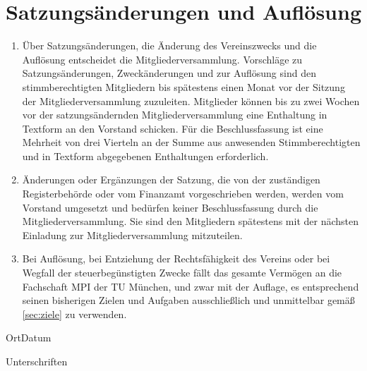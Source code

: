 \documentclass{article}
\begin{document}
\section{Satzungsänderungen und Auflösung}
\label{sec:satzungsaenderung}
\begin{enumerate}
	\item Über Satzungsänderungen, die Änderung des Vereinszwecks und die Auflösung  entscheidet die Mitgliederversammlung. Vorschläge zu Satzungsänderungen, Zweckänderungen und zur Auflösung sind den stimmberechtigten Mitgliedern bis spätestens einen Monat vor der Sitzung der Mitgliederversammlung zuzuleiten. Mitglieder können bis zu zwei Wochen vor der satzungsändernden Mitgliederversammlung eine Enthaltung in Textform an den Vorstand schicken. Für die Beschlussfassung ist eine Mehrheit von drei Vierteln an der Summe aus anwesenden Stimmberechtigten und in Textform abgegebenen Enthaltungen erforderlich.
	\item Änderungen oder Ergänzungen der Satzung, die von der zuständigen Registerbehörde oder vom Finanzamt vorgeschrieben werden, werden vom Vorstand umgesetzt und bedürfen keiner Beschlussfassung durch die Mitgliederversammlung. Sie sind den Mitgliedern spätestens mit der nächsten Einladung zur Mitgliederversammlung mitzuteilen.
	\item Bei Auflösung, bei Entziehung der Rechtsfähigkeit des Vereins oder bei Wegfall der steuerbegünstigten Zwecke fällt das gesamte Vermögen an die Fachschaft MPI der TU München, und zwar mit der Auflage, es entsprechend seinen bisherigen Zielen und Aufgaben ausschließlich und unmittelbar gemäß \ref{sec:ziele} zu verwenden.
\end{enumerate}

\vspace{2cm}
\hspace{2cm}Ort\hspace{7cm}Datum
\vspace{5cm}
\begin{center}
Unterschriften
\end{center}
\end{document}
